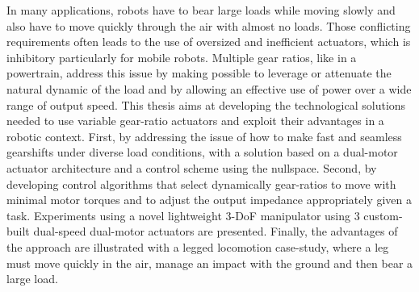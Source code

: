 In many applications, robots have to bear large loads while moving slowly and also have to move quickly through the air with almost no loads. Those conflicting requirements often leads to the use of oversized and inefficient actuators, which is inhibitory particularly for mobile robots. Multiple gear ratios, like in a powertrain, address this issue by making possible to leverage or attenuate the natural dynamic of the load and by allowing an effective use of power over a wide range of output speed. This thesis aims at developing the technological solutions needed to use variable gear-ratio actuators and exploit their advantages in a robotic context. First, by addressing the issue of how to make fast and seamless gearshifts under diverse load conditions, with a solution based on a dual-motor actuator architecture and a control scheme using the nullspace. Second, by developing control algorithms that select dynamically gear-ratios to move with minimal motor torques and to adjust the output impedance appropriately given a task. Experiments using a novel lightweight 3-DoF manipulator using 3 custom-built dual-speed dual-motor actuators are presented. Finally, the advantages of the approach are illustrated with a legged locomotion case-study, where a leg must move quickly in the air, manage an impact with the ground and then bear a large load.
